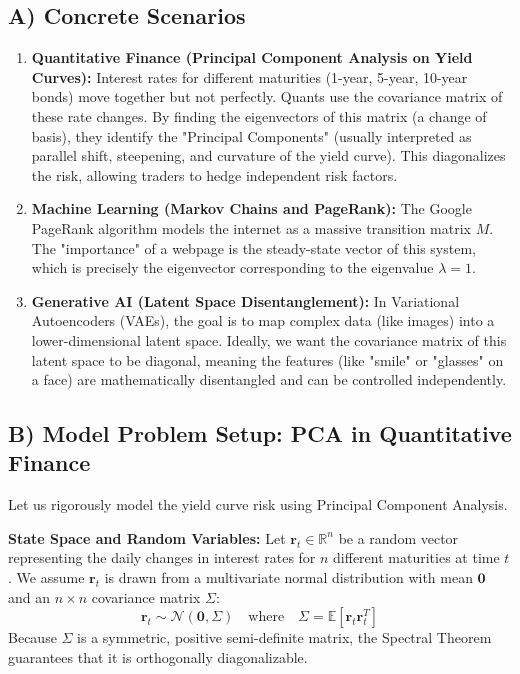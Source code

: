 \documentclass[11pt, a4paper]{article}
\theoremstyle{definition}
\theoremstyle{remark}
\newcommand{\R}{\mathbb{R}}
\newcommand{\E}{\mathbb{E}}
\begin{document}
\subsection{A) Concrete Scenarios}
\begin{enumerate}
    \item \textbf{Quantitative Finance (Principal Component Analysis on Yield Curves):} Interest rates for different maturities (1-year, 5-year, 10-year bonds) move together but not perfectly. Quants use the covariance matrix of these rate changes. By finding the eigenvectors of this matrix (a change of basis), they identify the "Principal Components" (usually interpreted as parallel shift, steepening, and curvature of the yield curve). This diagonalizes the risk, allowing traders to hedge independent risk factors.
    \item \textbf{Machine Learning (Markov Chains and PageRank):} The Google PageRank algorithm models the internet as a massive transition matrix $M$. The "importance" of a webpage is the steady-state vector of this system, which is precisely the eigenvector corresponding to the eigenvalue $\lambda = 1$.
    \item \textbf{Generative AI (Latent Space Disentanglement):} In Variational Autoencoders (VAEs), the goal is to map complex data (like images) into a lower-dimensional latent space. Ideally, we want the covariance matrix of this latent space to be diagonal, meaning the features (like "smile" or "glasses" on a face) are mathematically disentangled and can be controlled independently.
\end{enumerate}

\subsection{B) Model Problem Setup: PCA in Quantitative Finance}
Let us rigorously model the yield curve risk using Principal Component Analysis. 

\textbf{State Space and Random Variables:}
Let $\mathbf{r}_t \in \R^n$ be a random vector representing the daily changes in interest rates for $n$ different maturities at time $t$. We assume $\mathbf{r}_t$ is drawn from a multivariate normal distribution with mean $\mathbf{0}$ and an $n \times n$ covariance matrix $\Sigma$:
\[
\mathbf{r}_t \sim \mathcal{N}(\mathbf{0}, \Sigma) \quad \text{where} \quad \Sigma = \E[\mathbf{r}_t \mathbf{r}_t^T]
\]
Because $\Sigma$ is a symmetric, positive semi-definite matrix, the Spectral Theorem guarantees that it is orthogonally diagonalizable. 
\end{document}
